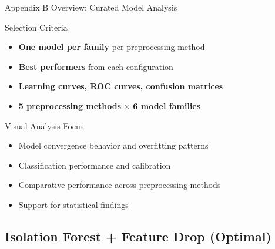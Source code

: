 \documentclass[10pt]{beamer}
\begin{document}
{\begin{frame}{Appendix B Overview: Curated Model Analysis}
\begin{block}{Selection Criteria}
\begin{itemize}
\item \textbf{One model per family} per preprocessing method
\item \textbf{Best performers} from each configuration
\item \textbf{Learning curves, ROC curves, confusion matrices}
\item \textbf{5 preprocessing methods} × \textbf{6 model families}
\end{itemize}
\end{block}

\begin{block}{Visual Analysis Focus}
\begin{itemize}
\item Model convergence behavior and overfitting patterns
\item Classification performance and calibration
\item Comparative performance across preprocessing methods
\item Support for statistical findings
\end{itemize}
\end{block}
\end{frame}


\subsection{Isolation Forest + Feature Drop (Optimal)}

}
\end{document}
